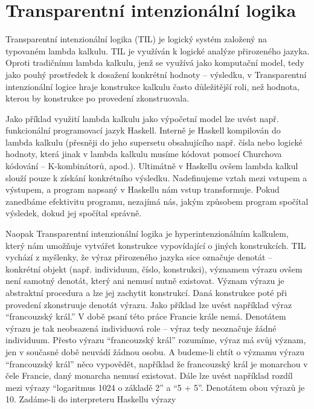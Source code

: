 \chapter{Transparentní intenzionální logika}
\label{sec:TILIntroduction}

Transparentní intenzionální logika (TIL) je logický systém založený na typovaném lambda kalkulu.
TIL je využíván k logické analýze přirozeného jazyka. Oproti tradičnímu lambda kalkulu, jenž
se využívá jako komputační model, tedy jako pouhý prostředek k dosažení konkrétní hodnoty --
výsledku, v Transparentní intenzionální logice hraje konstrukce kalkulu často důležitější roli,
než hodnota, kterou by konstrukce po provedení zkonstruovala.

Jako příklad využití lambda kalkulu jako výpočetní model lze uvést např. funkcionální programovací
jazyk Haskell. Interně je Haskell kompilován do lambda kalkulu (přesněji do jeho supersetu
obsahujícího např. čísla nebo logické hodnoty, která jinak v lambda kalkulu musíme kódovat pomocí
Churchova kódování -- K-kombinátorů, apod.). Ultimátně v Haskellu ovšem lambda kalkul slouží pouze
k získání konkrétního výsledku. Nadefinujeme vztah mezi vstupem a výstupem, a program napsaný
v Haskellu nám vstup transformuje. Pokud zanedbáme efektivitu programu, nezajímá nás, jakým
způsobem program spočítal výsledek, dokud jej spočítal správně.

Naopak Transparentní intenzionální logika je hyperintenzionálním kalkulem, který nám umožňuje
vytvářet konstrukce vypovídající o jiných konstrukcích. TIL vychází z myšlenky, že výraz
přirozeného jazyka sice označuje denotát -- konkrétní objekt (např. individuum, číslo, konstrukci),
významem výrazu ovšem není samotný denotát, který ani nemusí nutně existovat. Význam výrazu je
abstraktní procedura a lze jej zachytit konstrukcí. Daná konstrukce poté při provedení zkonstruuje
denotát výrazu. Jako příklad lze uvést například výraz ``francouzský král.'' V době psaní této práce
Francie krále nemá. Denotátem výrazu je tak neobsazená individuová role -- výraz tedy neoznačuje
žádné individuum. Přesto výrazu ``francouzský král'' rozumíme, výraz má svůj význam, jen v současné době neuvádí žádnou osobu.
A budeme-li chtít o významu výrazu ``francouzský král'' něco vypovědět, například že francouzský král
je monarchou v čele Francie, daný monarcha nemusí existovat. Dále lze uvést například rozdíl mezi
výrazy ``logaritmus 1024 o základě 2'' a ``5 + 5''. Denotátem obou výrazů je 10. Zadáme-li do
interpreteru Haskellu výrazy

